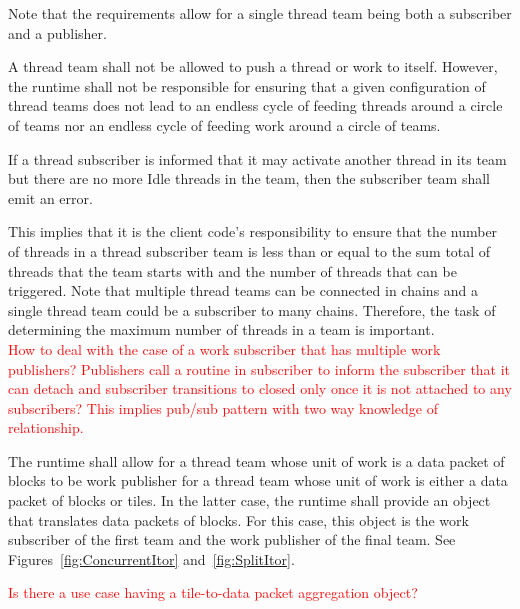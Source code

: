 \documentclass{article}
\begin{document}
Note that the requirements allow for a single thread team being both a
subscriber and a publisher.

\begin{req}
A thread team shall not be allowed to push a thread or work to itself.  However,
the runtime shall not be responsible for ensuring that a given configuration of
thread teams does not lead to an endless cycle of feeding threads around a
circle of teams nor an endless cycle of feeding work around a circle of teams.
\end{req}

\begin{req}
If a thread subscriber is informed that it may activate another thread in its
team but there are no more Idle threads in the team, then the
subscriber team shall emit an error.
\end{req}

This implies that it is the client code's responsibility to ensure that the
number of threads in a thread subscriber team is less than or equal to the sum
total of threads that the team starts with and the number of threads that can be
triggered.  Note that multiple thread teams can be connected in chains and a
single thread team could be a subscriber to many chains.  Therefore, the task of
determining the maximum number of threads in a team is important.\\

\textcolor{red}{How to deal with the case of a work subscriber that has
multiple work publishers?  Publishers call a routine in subscriber to inform the
subscriber that it can detach and subscriber transitions to closed only once it
is not attached to any subscribers?  This implies pub/sub pattern with two way
knowledge of relationship.}\\

\begin{req}
The runtime shall allow for a thread team whose unit of work is a data packet of
blocks to be work publisher for a thread team whose unit of work is either a
data packet of blocks or tiles.  In the latter case, the runtime shall provide
an object that translates data packets of blocks.  For this case, this object is
the work subscriber of the first team and the work publisher of the final team.
See Figures~\ref{fig:ConcurrentItor} and~\ref{fig:SplitItor}.
\end{req}

\textcolor{red}{Is there a use case having a tile-to-data packet aggregation
object?}
\end{document}
